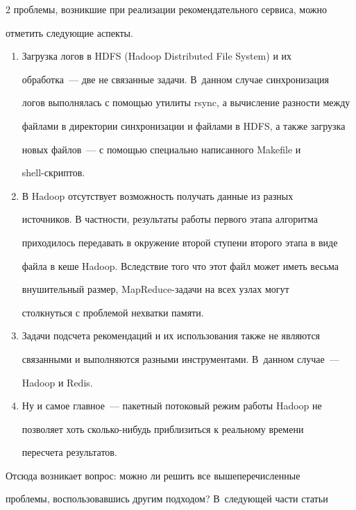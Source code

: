 \begin{multicols}{2}
проблемы, возникшие при реализации рекомендательного сервиса, можно 


отметить следующие аспекты.


   \begin{enumerate}[1.]


\item Загрузка логов в HDFS (Hadoop Distributed File System) и их 


обработка~--- две не связанные задачи. В~данном случае синхронизация 


логов выполнялась с помощью утилиты {\sf rsync}, а вы\-чис\-ле\-ние разности между 


файлами в директории синхронизации и файлами в HDFS, а также загрузка 


новых файлов~--- с помощью специально написанного Makefile и 


shell-скрип\-тов.


\item В Hadoop отсутствует возможность получать \mbox{данные} из разных 


источников. В частности, резуль\-та\-ты работы первого этапа алгоритма 


приходилось передавать в окружение второй ступени второго этапа в виде 


файла в кеше Hadoop. Вследствие того что этот файл может иметь весьма 


внушительный размер, MapReduce-за\-да\-чи на всех узлах могут 


столкнуться с проблемой нехватки памяти.


\item Задачи подсчета рекомендаций и их использования также не являются 


связанными и выполняются разными инструментами. В~данном случае~--- 


Hadoop и Redis.


\item Ну и самое главное~--- пакетный потоковый режим работы Hadoop не 


позволяет хоть сколь\-ко-ни\-будь приблизиться к реальному времени 


пересчета результатов.


   \end{enumerate}


   


   Отсюда возникает вопрос: можно ли решить все вышеперечисленные 


проблемы, воспользовавшись другим подходом? В~следующей части статьи 



\end{multicols}

